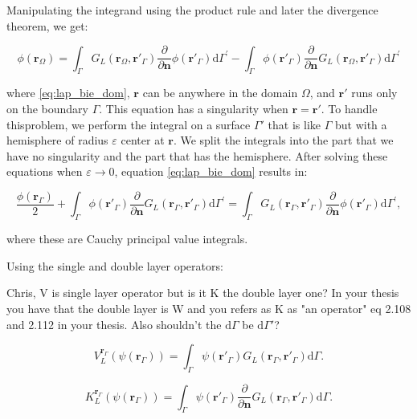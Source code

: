 Manipulating the integrand using the product rule and later the divergence 
theorem, we get:

\begin{equation} \label{eq:lap_bie_dom}
\phi(\mathbf{r}_\Omega) = \int_\Gamma G_L(\mathbf{r}_\Omega,\mathbf{r}'_\Gamma)  \frac{\partial} {\partial \mathbf{n}} \phi(\mathbf{r}'_\Gamma)  \text{d} \Gamma^\prime - \int_\Gamma \phi(\mathbf{r}'_\Gamma)  \frac{\partial}{\partial \mathbf{n}} G_L(\mathbf{r}_\Omega,\mathbf{r}'_\Gamma) \text{d} \Gamma^\prime
\end{equation}

\noindent where \eqref{eq:lap_bie_dom}, $\mathbf{r}$ can be anywhere in the domain $\Omega$, 
and $\mathbf{r}'$ runs only on the boundary $\Gamma$. This equation has a 
singularity when $\mathbf{r}=\mathbf{r}'$. To handle thisproblem, we perform the
integral on a surface $\Gamma'$ that is like $\Gamma$ but with a hemisphere of 
radius $\varepsilon$ center at $\mathbf{r}$. We split the integrals into the part
that we have no singularity and the part that has the hemisphere. After solving these
equations when $\varepsilon \to 0$, equation \eqref{eq:lap_bie_dom} results in:

\begin{equation} \label{eq:lap_bie}
\frac{\phi(\mathbf{r}_\Gamma)}{2} +  \int_\Gamma \phi(\mathbf{r}'_\Gamma)  \frac{\partial}{\partial \mathbf{n}} G_L(\mathbf{r}_\Gamma,\mathbf{r}'_\Gamma) \text{d} \Gamma^\prime = \int_\Gamma G_L(\mathbf{r}_\Gamma,\mathbf{r}'_\Gamma)  \frac{\partial} {\partial \mathbf{n}} \phi(\mathbf{r}'_\Gamma)  \text{d} \Gamma^\prime,
\end{equation}

\noindent where these are Cauchy principal value integrals.

Using the single and double layer operators:

{\color{red} Chris, V is single layer operator but is it K the double layer one? 
In your thesis you have that the double layer is W and you refers as K as
"an operator" eq 2.108 and 2.112 in your thesis. Also shouldn't the $\text{d} \Gamma$
be $\text{d} \Gamma'$? }

\begin{equation}\label{eq:single_layer}
V^{\mathbf{r}_\Gamma}_L (\psi(\mathbf{r}_\Gamma)) = \int_\Gamma \psi(\mathbf{r}'_\Gamma) G_L(\mathbf{r}_\Gamma, \mathbf{r}'_\Gamma) \text{d} \Gamma.
\end{equation}

\begin{equation}\label{eq:double_layer}
K^{\mathbf{r}_\Gamma}_L (\psi(\mathbf{r}_\Gamma)) = \int_\Gamma \psi(\mathbf{r}'_\Gamma) \frac{\partial}{\partial \mathbf{n}}G_L(\mathbf{r}_\Gamma, \mathbf{r}'_\Gamma) \text{d} \Gamma.
\end{equation}

